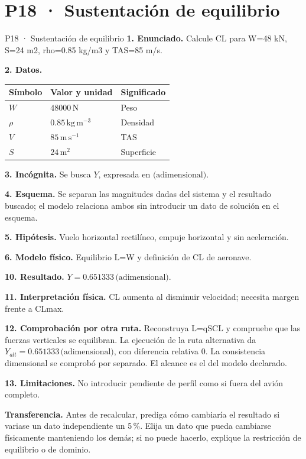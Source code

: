 \chapter*{P18 · Sustentación de equilibrio}
\begin{studiumworked}{P18 · Sustentación de equilibrio}
\textbf{1. Enunciado.} Calcule CL para W=48 kN, S=24 m2, rho=0.85 kg/m3 y TAS=85 m/s.

\textbf{2. Datos.}
\begin{longtable}{p{.16\linewidth}p{.35\linewidth}p{.38\linewidth}}\toprule Símbolo & Valor y unidad & Significado\\\midrule\endhead
$W$ & $48000\,\mathrm N$ & Peso\\
$\rho$ & $0.85\,\mathrm{kg\,m^{-3}}$ & Densidad\\
$V$ & $85\,\mathrm{m\,s^{-1}}$ & TAS\\
$S$ & $24\,\mathrm{m^2}$ & Superficie\\
\bottomrule\end{longtable}
\textbf{3. Incógnita.} Se busca $Y$, expresada en $\text{(adimensional)}$.

\textbf{4. Esquema.} Se separan las magnitudes dadas del sistema y el resultado buscado; el modelo relaciona ambos sin introducir un dato de solución en el esquema.

\textbf{5. Hipótesis.} Vuelo horizontal rectilíneo, empuje horizontal y sin aceleración.

\textbf{6. Modelo físico.} Equilibrio L=W y definición de CL de aeronave.


\textbf{10. Resultado.} $Y=0.651333\,\text{(adimensional)}$.

\textbf{11. Interpretación física.} CL aumenta al disminuir velocidad; necesita margen frente a CLmax.

\textbf{12. Comprobación por otra ruta.} Reconstruya L=qSCL y compruebe que las fuerzas verticales se equilibran. La ejecución de la ruta alternativa da $Y_{alt}=0.651333\,\text{(adimensional)}$, con diferencia relativa $0$. La consistencia dimensional se comprobó por separado. El alcance es el del modelo declarado.

\textbf{13. Limitaciones.} No introducir pendiente de perfil como si fuera del avión completo.

\textbf{Transferencia.} Antes de recalcular, prediga cómo cambiaría el resultado si variase un dato independiente un 5\,\%. Elija un dato que pueda cambiarse físicamente manteniendo los demás; si no puede hacerlo, explique la restricción de equilibrio o de dominio.\par
\end{studiumworked}
